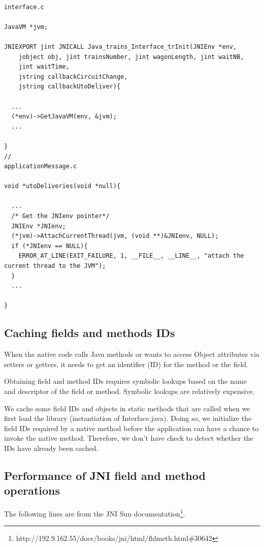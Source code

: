 \documentclass[a4paper,10pt]{report}
\begin{document}
\lstset{language=C}
\lstset{commentstyle=\textit} 
\begin{lstlisting}

interface.c

JavaVM *jvm;

JNIEXPORT jint JNICALL Java_trains_Interface_trInit(JNIEnv *env, 
    jobject obj, jint trainsNumber, jint wagonLength, jint waitNB, 
    jint waitTime, 
    jstring callbackCircuitChange,
    jstring callbackUtoDeliver){

  ...  
  (*env)->GetJavaVM(env, &jvm);
  ...

}
//
applicationMessage.c

void *utoDeliveries(void *null){

  ...
  /* Get the JNIenv pointer*/
  JNIEnv *JNIenv;
  (*jvm)->AttachCurrentThread(jvm, (void **)&JNIenv, NULL);
  if (*JNIenv == NULL){
    ERROR_AT_LINE(EXIT_FAILURE, 1, __FILE__, __LINE__, "attach the current thread to the JVM");
  }
  ...

}
\end{lstlisting}

\subsection{Caching fields and methods IDs}

When the native code calls Java methods or wants to access Object attributes via setters or getters, it needs to get an identifier (ID)
for the method or the field.

Obtaining field and method IDs requires symbolic lookups based
    on the name and descriptor of the field or method. Symbolic lookups
    are relatively expensive.
    
    We cache some field IDs and objects in static methods that are called
    when we first load the library (instantiation of Interface.java).
    Doing so, we initialize the field IDs required by a native method before
    the application can have a chance to invoke the native method.
    Therefore, we don't have check to detect whether the IDs have already
    been cached.

\subsection{Performance of JNI field and method operations}

The following lines are from the JNI Sun documentation\footnote{http://192.9.162.55/docs/books/jni/html/fldmeth.html\#30642}.\\
\end{document}
